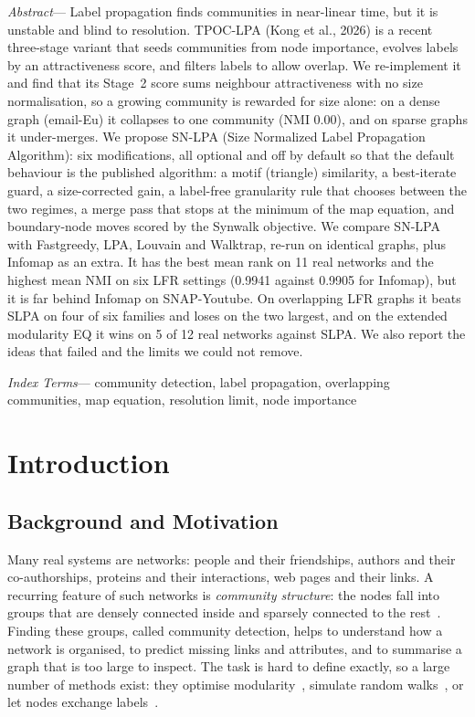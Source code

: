 \documentclass[conference]{IEEEtran}
\renewenvironment{abstract}{\par\noindent\footnotesize\fontseries{b}\selectfont\textit{Abstract}---\ignorespaces}{\par\vspace{0.5ex}}
\renewenvironment{IEEEkeywords}{\par\noindent\footnotesize\textit{Index Terms}---\ignorespaces}{\par\vspace{1ex}}
\begin{document}
\begin{abstract}
Label propagation finds communities in near-linear time, but it is unstable and blind to resolution. TPOC-LPA (Kong et al., 2026) is a recent three-stage variant that seeds communities from node importance, evolves labels by an attractiveness score, and filters labels to allow overlap. We re-implement it and find that its Stage~2 score sums neighbour attractiveness with no size normalisation, so a growing community is rewarded for size alone: on a dense graph (email-Eu) it collapses to one community (NMI 0.00), and on sparse graphs it under-merges. We propose SN-LPA (Size Normalized Label Propagation Algorithm): six modifications, all optional and off by default so that the default behaviour is the published algorithm: a motif (triangle) similarity, a best-iterate guard, a size-corrected gain, a label-free granularity rule that chooses between the two regimes, a merge pass that stops at the minimum of the map equation, and boundary-node moves scored by the Synwalk objective. We compare SN-LPA with Fastgreedy, LPA, Louvain and Walktrap, re-run on identical graphs, plus Infomap as an extra. It has the best mean rank on 11 real networks and the highest mean NMI on six LFR settings (0.9941 against 0.9905 for Infomap), but it is far behind Infomap on SNAP-Youtube. On overlapping LFR graphs it beats SLPA on four of six families and loses on the two largest, and on the extended modularity EQ it wins on 5 of 12 real networks against SLPA. We also report the ideas that failed and the limits we could not remove.
\end{abstract}

\begin{IEEEkeywords}
community detection, label propagation, overlapping communities, map equation, resolution limit, node importance
\end{IEEEkeywords}

\section{Introduction}\label{sec:intro}
\subsection{Background and Motivation}
Many real systems are networks: people and their friendships, authors and their co-authorships, proteins and their interactions, web pages and their links. A recurring feature of such networks is \emph{community structure}: the nodes fall into groups that are densely connected inside and sparsely connected to the rest~\cite{girvan2002,fortunato2010}. Finding these groups, called community detection, helps to understand how a network is organised, to predict missing links and attributes, and to summarise a graph that is too large to inspect. The task is hard to define exactly, so a large number of methods exist: they optimise modularity~\cite{newman2004}, simulate random walks~\cite{pons2006,rosvall2008}, or let nodes exchange labels~\cite{raghavan2007}.
\end{document}
